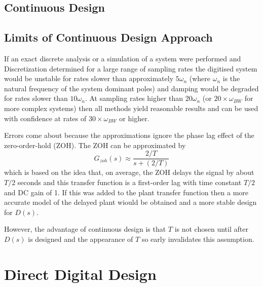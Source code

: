 \subsection*{Continuous Design}

\subsection*{Limits of Continuous Design Approach}

If an exact discrete analysis or a simulation of a system were performed and Discretization determined for a large range of sampling rates the digitised system would be unstable for rates slower than approximately $5\omega_n$ (where $\omega_n$ is the natural frequency of the system dominant poles) and damping would be degraded for rates slower than $10\omega_n$. At sampling rates higher than $20\omega_n$ (or $20\times \omega_{BW}$ for more complex systems) then all methods yield reasonable results and can be used with confidence at rates of $30\times \omega_{BW}$ or higher.

Errors come about because the approximations ignore the phase lag effect of the zero-order-hold (ZOH). The ZOH can be approximated by $$G_{zoh}(s)\approx \frac{2/T}{s+(2/T)}$$ which is based on the idea that, on average, the ZOH delays the signal by about $T/2$ seconds and this transfer function is a first-order lag with time constant $T/2$ and DC gain of 1. If this was added to the plant transfer function then a more accurate model of the delayed plant wiould be obtained and a more stable design for $D(s)$.

However, the advantage of continuous design is that $T$ is not chosen until after $D(s)$ is designed and the appearance of $T$ so early invalidates this assumption.

\section*{Direct Digital Design}

\endinput


